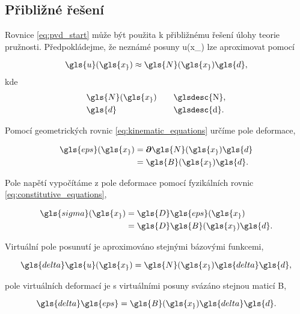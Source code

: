 \subsection{Přibližné řešení} \label{sec:approximate_solution}

Rovnice \ref{eq:pvd_start} může být použita k přibližnému řešení úlohy teorie pružnosti. Předpokládejme, že neznámé posuny \gls{u}(\gls{x_}) lze aproximovat pomocí

\begin{equation} \label{eq:approx_first}
    \gls{u}(\gls{x_}) \approx \gls{N}(\gls{x_})\gls{d},
\end{equation}
kde
\begin{alignat*}{2}
    & \gls{N}(\gls{x_})     && \quad \text{\glsdesc{N},} \\
    & \gls{d}               && \quad \text{\glsdesc{d}.}
\end{alignat*}

Pomocí geometrických rovnic \ref{eq:kinematic_equations} určíme pole deformace,

\begin{equation}
    \begin{split}
        \gls{eps}(\gls{x_}) &= \boldsymbol\partial\gls{N}(\gls{x_}){\gls{d}} \\
                            &= \gls{B}(\gls{x_}){\gls{d}}.
    \end{split}
\end{equation}

Pole napětí vypočítáme z pole deformace pomocí fyzikálních rovnic \ref{eq:constitutive_equations},

\begin{equation}
    \begin{split}
        \gls{sigma}(\gls{x_}) &= \gls{D} \gls{eps}(\gls{x_}) \\
                             &= \gls{D} \gls{B}(\gls{x_}){\gls{d}}.
    \end{split}
\end{equation}

Virtuální pole posunutí je aproximováno stejnými bázovými funkcemi,

\begin{equation}
    \gls{delta}\gls{u}(\gls{x_}) = \gls{N}(\gls{x_})\gls{delta}\gls{d},
\end{equation}

pole virtuálních deformací je s virtuálními posuny svázáno stejnou maticí \gls{B},

\begin{equation} \label{eq:approx_last}
    \gls{delta}\gls{eps} = \gls{B}(\gls{x_})\gls{delta}\gls{d}.
\end{equation}

